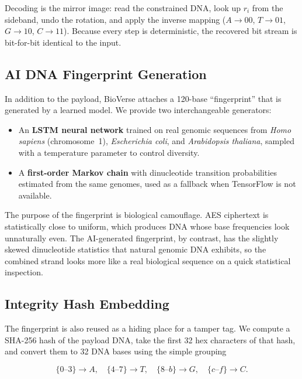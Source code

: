 \documentclass[conference]{IEEEtran}
\begin{document}
Decoding is the mirror image: read the constrained DNA, look up $r_i$ from the sideband, undo the rotation, and apply the inverse mapping ($A\!\to\!00$, $T\!\to\!01$, $G\!\to\!10$, $C\!\to\!11$). Because every step is deterministic, the recovered bit stream is bit-for-bit identical to the input.

\subsection{AI DNA Fingerprint Generation}

In addition to the payload, BioVerse attaches a 120-base ``fingerprint'' that is generated by a learned model. We provide two interchangeable generators:

\begin{itemize}
\item An \textbf{LSTM neural network} trained on real genomic sequences from \textit{Homo sapiens} (chromosome~1), \textit{Escherichia coli}, and \textit{Arabidopsis thaliana}, sampled with a temperature parameter to control diversity.
\item A \textbf{first-order Markov chain} with dinucleotide transition probabilities estimated from the same genomes, used as a fallback when TensorFlow is not available.
\end{itemize}

The purpose of the fingerprint is biological camouflage. AES ciphertext is statistically close to uniform, which produces DNA whose base frequencies look unnaturally even. The AI-generated fingerprint, by contrast, has the slightly skewed dinucleotide statistics that natural genomic DNA exhibits, so the combined strand looks more like a real biological sequence on a quick statistical inspection.

\subsection{Integrity Hash Embedding}

The fingerprint is also reused as a hiding place for a tamper tag. We compute a SHA-256 hash of the payload DNA, take the first 32 hex characters of that hash, and convert them to 32 DNA bases using the simple grouping

\begin{equation}
\{0\text{--}3\} \to A, \quad \{4\text{--}7\} \to T, \quad \{8\text{--}b\} \to G, \quad \{c\text{--}f\} \to C.
\label{eq:hex_mapping}
\end{equation}
\end{document}
